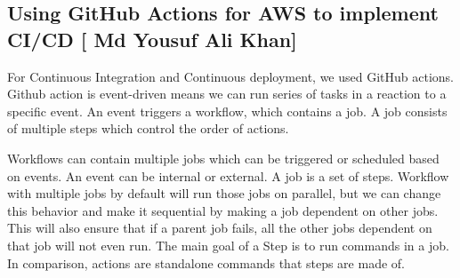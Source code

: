 
\subsection{Using GitHub Actions for AWS to implement CI/CD [ Md Yousuf Ali Khan]}\label{sec:chapter_1}
For Continuous Integration and Continuous deployment, we used GitHub actions. Github action is event-driven means we can run series of tasks in a reaction to a specific event. An event triggers a workflow, which contains a job. A job consists of multiple steps which control the order of actions.

Workflows can contain multiple jobs which can be triggered or scheduled based on events. An event can be internal or external. A job is a set of steps. Workflow with multiple jobs by default will run those jobs on parallel, but we can change this behavior and make it sequential by making a job dependent on other jobs. This will also ensure that if a parent job fails, all the other jobs dependent on that job will not even run. The main goal of a Step is to run commands in a job. In comparison, actions are standalone commands that steps are made of. 

